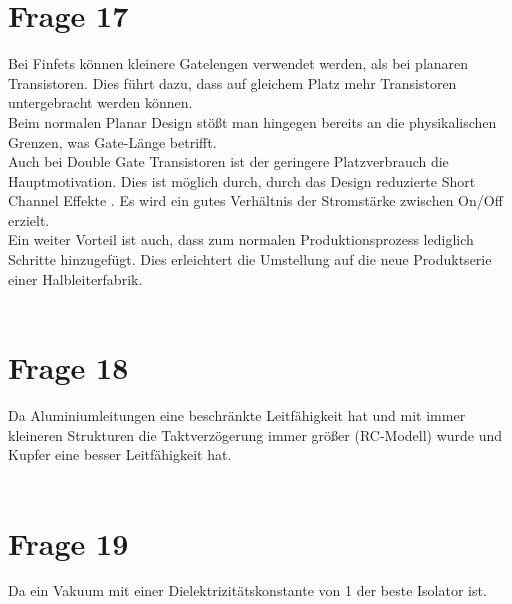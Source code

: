 \documentclass[a4paper]{scrartcl}
\begin{document}
\section*{Frage 17}
Bei Finfets können kleinere Gatelengen verwendet werden, als bei planaren Transistoren. Dies führt dazu, dass auf gleichem Platz mehr Transistoren untergebracht werden können.\\
Beim normalen Planar Design stößt man hingegen bereits an die physikalischen Grenzen, was Gate-Länge betrifft.\\
Auch bei Double Gate Transistoren ist der geringere Platzverbrauch die Hauptmotivation. Dies ist möglich durch, durch das Design reduzierte Short Channel Effekte . Es wird ein gutes Verhältnis der Stromstärke zwischen On/Off erzielt.\\
Ein weiter Vorteil ist auch, dass zum normalen Produktionsprozess lediglich Schritte hinzugefügt. Dies erleichtert die Umstellung auf die neue Produktserie einer Halbleiterfabrik.
~\\
~\\
\section*{Frage 18}
Da Aluminiumleitungen eine beschränkte Leitfähigkeit hat und mit immer kleineren Strukturen die Taktverzögerung immer größer (RC-Modell) wurde und Kupfer eine besser Leitfähigkeit hat.
~\\
~\\
\section*{Frage 19}
Da ein Vakuum mit einer Dielektrizitätskonstante von 1 der beste Isolator ist.
~\\
~\\
\end{document}
